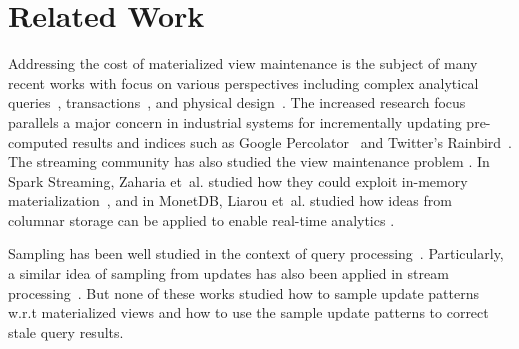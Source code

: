 \vspace{-.5em}
\section{Related Work}\label{related}
\vspace{-.25em}
Addressing the cost of materialized view maintenance is the subject of many recent works with
focus on various perspectives including complex analytical queries~\cite{nikolic2014linview}, transactions~\cite{bailis2014scalable}, and physical design~\cite{lefevre2014opportunistic}.
The increased research focus parallels a major concern in industrial systems for incrementally updating pre-computed results and indices such as Google Percolator~\cite{percolator} and Twitter's Rainbird~\cite{rainbird}.
The streaming community has also studied the view maintenance problem \cite{abadi2003aurora,golab2011consistency, golab2012scalable, he2010comet, ghanem2010supporting, KrishnamurthyFDFGLT10}. In Spark Streaming, Zaharia et~al. studied how they could exploit in-memory materialization~\cite{zaharia2012discretized}, and in MonetDB, Liarou et~al. studied how ideas from columnar storage can be applied to enable real-time analytics \cite{liarou2012monetdb}.


Sampling has been well studied in the context of query processing~\cite{AgarwalMPMMS13, olken1993random, garofalakis2001approximate}. Particularly, a similar idea of sampling from updates has also been applied in stream processing~\cite{tatbul2003load, Garofalakis, rabkin2014aggregation}. But none of these works studied how to sample update patterns w.r.t materialized views and how to use the sample update patterns to correct stale query results.

